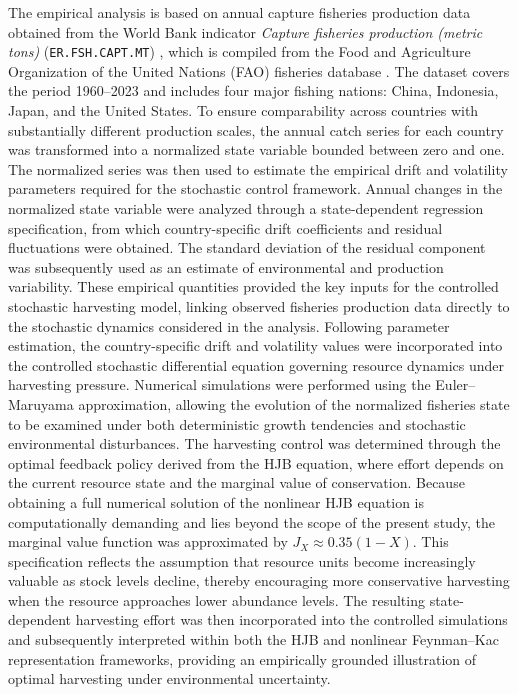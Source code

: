 \documentclass[11pt]{article}
\begin{document}
	The empirical analysis is based on annual capture fisheries production data obtained from the World Bank indicator \textit{Capture fisheries production (metric tons)} (\texttt{ER.FSH.CAPT.MT}) \cite{worldbank_capture_2026}, which is compiled from the Food and Agriculture Organization of the United Nations (FAO) fisheries database \cite{fao_capture_database_2026}. The dataset covers the period 1960--2023 and includes four major fishing nations: China, Indonesia, Japan, and the United States. To ensure comparability across countries with substantially different production scales, the annual catch series for each country was transformed into a normalized state variable bounded between zero and one. The normalized series was then used to estimate the empirical drift and volatility parameters required for the stochastic control framework. Annual changes in the normalized state variable were analyzed through a state-dependent regression specification, from which country-specific drift coefficients and residual fluctuations were obtained. The standard deviation of the residual component was subsequently used as an estimate of environmental and production variability. These empirical quantities provided the key inputs for the controlled stochastic harvesting model, linking observed fisheries production data directly to the stochastic dynamics considered in the analysis. Following parameter estimation, the country-specific drift and volatility values were incorporated into the controlled stochastic differential equation governing resource dynamics under harvesting pressure. Numerical simulations were performed using the Euler--Maruyama approximation, allowing the evolution of the normalized fisheries state to be examined under both deterministic growth tendencies and stochastic environmental disturbances. The harvesting control was determined through the optimal feedback policy derived from the HJB equation, where effort depends on the current resource state and the marginal value of conservation. Because obtaining a full numerical solution of the nonlinear HJB equation is computationally demanding and lies beyond the scope of the present study, the marginal value function was approximated by $J_X\approx0.35(1-X)$. This specification reflects the assumption that resource units become increasingly valuable as stock levels decline, thereby encouraging more conservative harvesting when the resource approaches lower abundance levels. The resulting state-dependent harvesting effort was then incorporated into the controlled simulations and subsequently interpreted within both the HJB and nonlinear Feynman--Kac representation frameworks, providing an empirically grounded illustration of optimal harvesting under environmental uncertainty.
	
\end{document}
